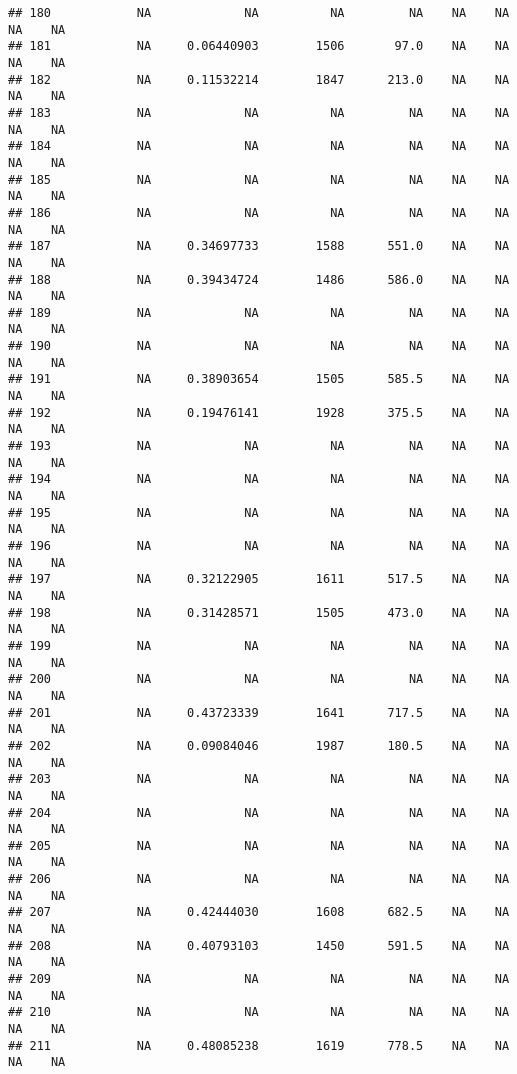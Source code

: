 \documentclass[]{article}
\begin{document}
\begin{verbatim}
## 180            NA             NA          NA         NA    NA    NA    NA    NA
## 181            NA     0.06440903        1506       97.0    NA    NA    NA    NA
## 182            NA     0.11532214        1847      213.0    NA    NA    NA    NA
## 183            NA             NA          NA         NA    NA    NA    NA    NA
## 184            NA             NA          NA         NA    NA    NA    NA    NA
## 185            NA             NA          NA         NA    NA    NA    NA    NA
## 186            NA             NA          NA         NA    NA    NA    NA    NA
## 187            NA     0.34697733        1588      551.0    NA    NA    NA    NA
## 188            NA     0.39434724        1486      586.0    NA    NA    NA    NA
## 189            NA             NA          NA         NA    NA    NA    NA    NA
## 190            NA             NA          NA         NA    NA    NA    NA    NA
## 191            NA     0.38903654        1505      585.5    NA    NA    NA    NA
## 192            NA     0.19476141        1928      375.5    NA    NA    NA    NA
## 193            NA             NA          NA         NA    NA    NA    NA    NA
## 194            NA             NA          NA         NA    NA    NA    NA    NA
## 195            NA             NA          NA         NA    NA    NA    NA    NA
## 196            NA             NA          NA         NA    NA    NA    NA    NA
## 197            NA     0.32122905        1611      517.5    NA    NA    NA    NA
## 198            NA     0.31428571        1505      473.0    NA    NA    NA    NA
## 199            NA             NA          NA         NA    NA    NA    NA    NA
## 200            NA             NA          NA         NA    NA    NA    NA    NA
## 201            NA     0.43723339        1641      717.5    NA    NA    NA    NA
## 202            NA     0.09084046        1987      180.5    NA    NA    NA    NA
## 203            NA             NA          NA         NA    NA    NA    NA    NA
## 204            NA             NA          NA         NA    NA    NA    NA    NA
## 205            NA             NA          NA         NA    NA    NA    NA    NA
## 206            NA             NA          NA         NA    NA    NA    NA    NA
## 207            NA     0.42444030        1608      682.5    NA    NA    NA    NA
## 208            NA     0.40793103        1450      591.5    NA    NA    NA    NA
## 209            NA             NA          NA         NA    NA    NA    NA    NA
## 210            NA             NA          NA         NA    NA    NA    NA    NA
## 211            NA     0.48085238        1619      778.5    NA    NA    NA    NA

\end{verbatim}
\end{document}
